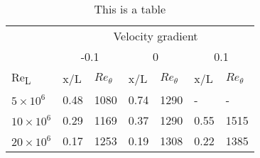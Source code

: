 


\begin{table}[H]
\centering
\begin{tabular}{l|l|l|l|l|l|l|}
\cline{2-7}
                           & \multicolumn{6}{c|}{Velocity gradient}                                        \\ \cline{2-7} 
                           & \multicolumn{2}{c|}{-0.1} & \multicolumn{2}{c|}{0} & \multicolumn{2}{c|}{0.1} \\ \hline
\multicolumn{1}{|l|}{Re\textsubscript{L}}  & x/L          & $Re_\theta$       & x/L        & $Re_\theta$      & x/L         & $Re_\theta$      \\ \hline
\multicolumn{1}{|l|}{$5\times 10^6$}  & 0.48       & 1080         & 0.74     & 1290        & -         & -            \\ \hline
\multicolumn{1}{|l|}{$10\times 10^6$} & 0.29       & 1169         & 0.37     & 1290        & 0.55      & 1515         \\ \hline
\multicolumn{1}{|l|}{$20\times 10^6$} & 0.17       & 1253         & 0.19     & 1308        & 0.22      & 1385         \\ \hline
\end{tabular}
\caption{This is a table}
\end{table}